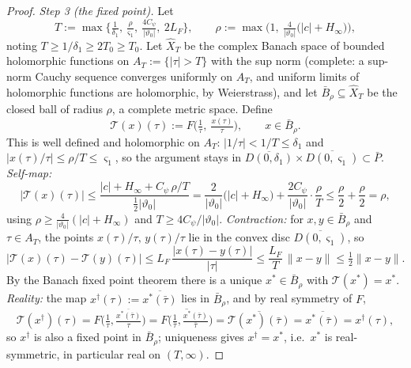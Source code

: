 \documentclass[11pt]{article}
\theoremstyle{definition}
\theoremstyle{remark}
\theoremstyle{plain}
\newcommand{\cT}{\mathcal{T}}
\begin{document}
\begin{proof}
\emph{Step 3 (the fixed point).}  Let
\[
T:=\max\Big\{\tfrac1{\delta_1},\ \tfrac{\rho}{\varsigma_1},\
\tfrac{4C_\psi}{|\vartheta_0|},\ 2L_F\Big\},
\qquad
\rho:=\max\Big(1,\ \tfrac{4}{|\vartheta_0|}\big(|c|+H_\infty\big)\Big),
\]
noting $T\ge1/\delta_1\ge2T_0\ge T_0$.  Let $\widehat X_T$ be the complex Banach space
of bounded holomorphic functions on $A_T:=\{|\tau|>T\}$ with the sup norm (complete:
a sup-norm Cauchy sequence converges uniformly on $A_T$, and uniform limits of
holomorphic functions are holomorphic, by Weierstrass), and let
$\bar B_\rho\subseteq\widehat X_T$ be the closed ball of radius $\rho$, a complete
metric space.  Define
\[
\cT(x)(\tau):=F\Big(\tfrac1\tau,\ \tfrac{x(\tau)}{\tau}\Big),\qquad x\in\bar B_\rho .
\]
This is well defined and holomorphic on $A_T$: $|1/\tau|<1/T\le\delta_1$ and
$|x(\tau)/\tau|\le\rho/T\le\varsigma_1$, so the argument stays in
$\overline{D(0,\delta_1)}\times\overline{D(0,\varsigma_1)}\subset\bar P$.
\emph{Self-map:}
\[
|\cT(x)(\tau)|
\le\frac{|c|+H_\infty+C_\psi\,\rho/T}{\tfrac12|\vartheta_0|}
=\frac{2}{|\vartheta_0|}\big(|c|+H_\infty\big)
+\frac{2C_\psi}{|\vartheta_0|}\cdot\frac{\rho}{T}
\le\frac{\rho}{2}+\frac{\rho}{2}=\rho,
\]
using $\rho\ge\frac4{|\vartheta_0|}(|c|+H_\infty)$ and
$T\ge4C_\psi/|\vartheta_0|$.  \emph{Contraction:} for $x,y\in\bar B_\rho$ and
$\tau\in A_T$, the points $x(\tau)/\tau,\,y(\tau)/\tau$ lie in the convex disc
$\overline{D(0,\varsigma_1)}$, so
\[
|\cT(x)(\tau)-\cT(y)(\tau)|
\le L_F\,\frac{|x(\tau)-y(\tau)|}{|\tau|}
\le\frac{L_F}{T}\,\|x-y\|\le\tfrac12\|x-y\| .
\]
By the Banach fixed point theorem there is a unique $x^*\in\bar B_\rho$ with
$\cT(x^*)=x^*$.  \emph{Reality:} the map $x^\dagger(\tau):=\overline{x^*(\bar\tau)}$
lies in $\bar B_\rho$, and by real symmetry of $F$,
\[
\cT(x^\dagger)(\tau)=F\big(\tfrac1\tau,\tfrac{\overline{x^*(\bar\tau)}}{\tau}\big)
=\overline{F\big(\tfrac1{\bar\tau},\tfrac{x^*(\bar\tau)}{\bar\tau}\big)}
=\overline{\cT(x^*)(\bar\tau)}=\overline{x^*(\bar\tau)}=x^\dagger(\tau),
\]
so $x^\dagger$ is also a fixed point in $\bar B_\rho$; uniqueness gives
$x^\dagger=x^*$, i.e.\ $x^*$ is real-symmetric, in particular real on $(T,\infty)$.


\end{proof}
\end{document}

